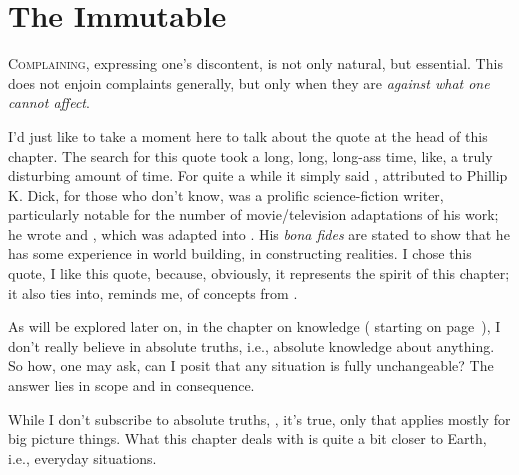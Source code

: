 \documentclass[../butidigress.tex]{subfiles}
\begin{document}
\chapter{The Immutable}\label{chap:immutable}
\newpage

\lettrine{C}{omplaining}, expressing one's discontent, is not only natural, but essential.
This does not enjoin complaints generally, but only when they are \emph{against what one cannot affect}.

I'd just like to take a moment here to talk about the quote at the head of this chapter.
The search for this quote took a long, long, long-ass time, like, a truly disturbing amount of time.
For quite a while it simply said , attributed to 
Phillip K. Dick, for those who don't know, was a prolific science-fiction writer, particularly notable for the number of movie/television adaptations of his work; he wrote  and , which was adapted into .
His \textit{bona fides} are stated to show that he has some experience in world building, in constructing realities.
I chose this quote, I like this quote, because, obviously, it represents the spirit of this chapter; it also ties into, reminds me, of concepts from .

As will be explored later on, in the chapter on knowledge ( starting on page~\pageref{chap:knowledge}), I don't really believe in absolute truths, i.e., absolute knowledge about anything.
So how, one may ask, can I posit that any situation is fully unchangeable?
The answer lies in scope and in consequence.

While I don't subscribe to absolute truths, , it's true, only  that applies mostly for big picture things.
What this chapter deals with is quite a bit closer to Earth, i.e., everyday situations.
\end{document}
